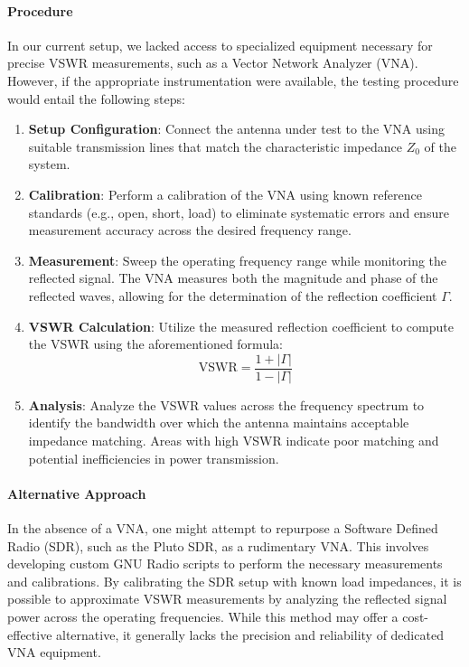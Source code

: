 \documentclass[12pt,letter]{article}
\begin{document}
\paragraph{Procedure}
In our current setup, we lacked access to specialized equipment necessary for precise VSWR measurements, such as a Vector Network Analyzer (VNA). However, if the appropriate instrumentation were available, the testing procedure would entail the following steps:

\begin{enumerate}
    \item \textbf{Setup Configuration}: Connect the antenna under test to the VNA using suitable transmission lines that match the characteristic impedance \( Z_0 \) of the system.
    
    \item \textbf{Calibration}: Perform a calibration of the VNA using known reference standards (e.g., open, short, load) to eliminate systematic errors and ensure measurement accuracy across the desired frequency range.
    
    \item \textbf{Measurement}: Sweep the operating frequency range while monitoring the reflected signal. The VNA measures both the magnitude and phase of the reflected waves, allowing for the determination of the reflection coefficient \( \Gamma \).
    
    \item \textbf{VSWR Calculation}: Utilize the measured reflection coefficient to compute the VSWR using the aforementioned formula:
    \[
    \text{VSWR} = \frac{1 + |\Gamma|}{1 - |\Gamma|}
    \]
    
    \item \textbf{Analysis}: Analyze the VSWR values across the frequency spectrum to identify the bandwidth over which the antenna maintains acceptable impedance matching. Areas with high VSWR indicate poor matching and potential inefficiencies in power transmission.
\end{enumerate}

\paragraph{Alternative Approach} In the absence of a VNA, one might attempt to repurpose a Software Defined Radio (SDR), such as the Pluto SDR, as a rudimentary VNA. This involves developing custom GNU Radio scripts to perform the necessary measurements and calibrations. By calibrating the SDR setup with known load impedances, it is possible to approximate VSWR measurements by analyzing the reflected signal power across the operating frequencies. While this method may offer a cost-effective alternative, it generally lacks the precision and reliability of dedicated VNA equipment.
\end{document}
